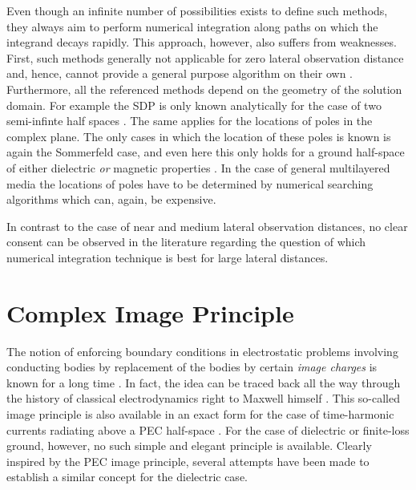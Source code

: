Even though an infinite number of possibilities exists to define such methods,
they always aim to perform numerical integration along paths on which the
integrand decays rapidly.
This approach, however, also suffers from weaknesses.
First, such methods generally not applicable for zero lateral observation
distance and, hence, cannot provide a general purpose algorithm on their own
\cite{Michalski2016a}.
Furthermore, all the referenced methods depend on the geometry of the 
solution domain.
For example the \ac{SDP} is only known analytically for the case of two
semi-infinte half spaces \cite[\S2.5.2]{Chew1999}.
The same applies for the locations of poles in the complex plane.
The only cases in which the location of these poles is known is again
the Sommerfeld case, and even here this only holds for a ground half-space of
either dielectric \emph{or} magnetic properties \cite{Michalski2016b}.
In the case of general multilayered media the locations of poles have to be
determined by numerical searching algorithms \cite{rodriguez-berral2004}
which can, again, be expensive.

In contrast to the case of near and medium lateral observation distances,
no clear consent can be observed in the literature regarding the question of
which numerical integration technique is best for large lateral distances.










\section{Complex Image Principle}

The notion of enforcing boundary conditions in electrostatic problems
involving conducting bodies by replacement of the bodies by certain
\emph{image charges} is known for a long time \cite[pp.~69]{Jackson2013}.
In fact, the idea can be traced back all the way through the history of
classical electrodynamics right to Maxwell himself
\cite[Chapter~XI]{maxwell1873}.
This so-called image principle is also available in an exact form for the
case of time-harmonic currents radiating above a \ac{PEC} half-space
\cite[243]{Sommerfeld1964}\cite[pp.~94]{Jin2015}.
For the case of dielectric or finite-loss ground, however, no such simple and
elegant principle is available.
Clearly inspired by the \ac{PEC} image principle, several attempts have been
made to establish a similar concept for the dielectric case.

